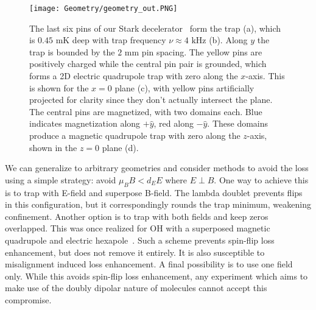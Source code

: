 \documentclass[%
 reprint,
groupedaddress,
 amsmath,amssymb,
 aps,
prl,
]{revtex4-1}
\newcommand{\epb}{{$E\!\perp\!B$}}
\begin{document}



\begin{figure}[tb]
\texttt{[image: Geometry/geometry\_out.PNG]}%
\caption{
The last six pins of our Stark decelerator~\cite{Sawyer2008} form the trap (a), which is $0.45\text{ mK}$ deep with trap frequency $\nu\approx4\text{ kHz}$ (b). Along $y$ the trap is bounded by the $2\text{ mm}$ pin spacing. The yellow pins are positively charged while the central pin pair is grounded, which forms a 2D electric quadrupole trap with zero along the $x$-axis. This is shown for the $x=0$ plane (c), with yellow pins artificially projected for clarity since they don't actually intersect the plane. The central pins are magnetized, with two domains each. Blue indicates magnetization along $+\hat{y}$, red along $-\hat{y}$. These domains produce a magnetic quadrupole trap with zero along the $z$-axis, shown in the $z=0$ plane (d). %
\label{fig:CAD}}
\end{figure}

We can generalize to arbitrary geometries and consider methods to avoid the loss using a simple strategy: avoid $\mu_BB < d_EE$ where \epb. One way to achieve this is to trap with E-field and superpose B-field. The lambda doublet prevents flips in this configuration, but it correspondingly rounds the trap minimum, weakening confinement. Another option is to trap with both fields and keep zeros overlapped. This was once realized for OH with a superposed magnetic quadrupole and electric hexapole~\cite{Sawyer2007}. Such a scheme prevents spin-flip loss enhancement, but does not remove it entirely. It is also susceptible to misalignment induced loss enhancement. A final possibility is to use one field only. While this avoids spin-flip loss enhancement, any experiment which aims to make use of the doubly dipolar nature of molecules cannot accept this compromise. 
\end{document}
